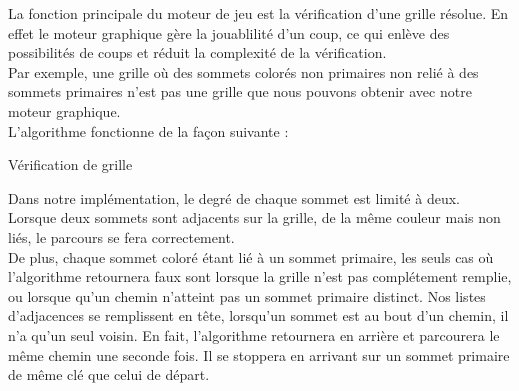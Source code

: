 La fonction principale du moteur de jeu est la vérification d'une grille résolue. En effet le moteur graphique gère la jouablilité d'un coup, ce qui enlève des possibilités de coups et réduit la complexité de la vérification. \\

	Par exemple, une grille où des sommets colorés non primaires non relié à des sommets primaires n'est pas une grille que nous pouvons obtenir avec notre moteur graphique. \\

L'algorithme fonctionne de la façon suivante : \\
\begin{algorithm}[H]
 
\caption{Vérification de grille}
\end{algorithm}

	Dans notre implémentation, le degré de chaque sommet est limité à deux. Lorsque deux sommets sont adjacents sur la grille, de la même couleur mais non liés, le parcours se fera correctement.\\
    
    De plus, chaque sommet coloré étant lié à un sommet primaire, les seuls cas où l'algorithme retournera faux sont lorsque la grille n'est pas complétement remplie, ou lorsque qu'un chemin n'atteint pas un sommet primaire distinct. Nos listes d'adjacences se remplissent en tête, lorsqu'un sommet est au bout d'un chemin, il n'a qu'un seul voisin. En fait, l'algorithme retournera en arrière et parcourera le même chemin une seconde fois. Il se stoppera en arrivant sur un sommet primaire de même clé que celui de départ.